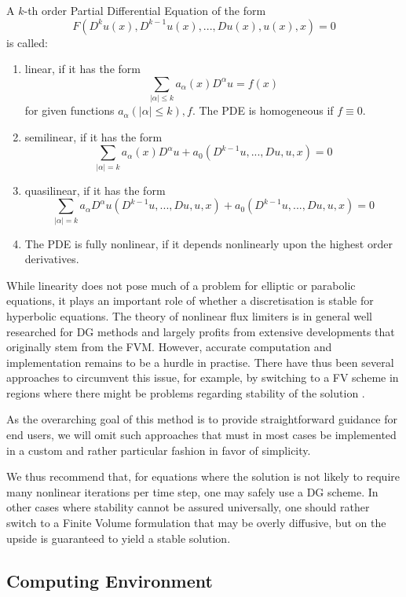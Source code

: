 \documentclass[sn-mathphys,Numbered]{sn-jnl}%
\theoremstyle{thmstyleone}%
\theoremstyle{thmstyletwo}%
\theoremstyle{thmstylethree}%
\begin{document}
A $k$-th order Partial Differential Equation of the form $$F(D^k u(x), D^{k-1} u(x),...,Du(x), u(x), x) = 0$$ is called:
\begin{enumerate}
    \item linear, if it has the form
    $$ \sum\limits_{\lvert \alpha \rvert \leq k} a_\alpha (x) D^\alpha u = f(x) $$
    for given functions $a_\alpha (\lvert \alpha \rvert \leq k), f$. The PDE is homogeneous if $f \equiv 0$. 
    \item semilinear, if it has the form
    $$ \sum\limits_{\lvert \alpha \rvert = k} a_\alpha (x) D^\alpha u + a_0 (D^{k-1}u,...,Du,u,x) = 0 $$
    \item quasilinear, if it has the form
    $$ \sum\limits_{\lvert \alpha \rvert = k} a_\alpha D^\alpha u (D^{k-1}u,...,Du,u,x) + a_0 (D^{k-1}u,...,Du,u,x) = 0 $$
    \item The PDE is fully nonlinear, if it depends nonlinearly upon the highest order derivatives.
\end{enumerate}
While linearity does not pose much of a problem for elliptic or parabolic equations, it plays an important role of whether a discretisation is stable for hyperbolic equations.
The theory of nonlinear flux limiters is in general well researched for DG methods and largely profits from extensive developments that originally stem from the FVM.
However, accurate computation and implementation remains to be a hurdle in practise.
There have thus been several approaches to circumvent this issue, for example, by switching to a FV scheme in regions where there might be problems regarding stability of the solution \cite{maltsevHybridDiscontinuousGalerkinfinite2023,sonntagShockCapturingDiscontinuous2014}.

As the overarching goal of this method is to provide straightforward guidance for end users, we will omit such approaches that must in most cases be implemented in a custom and rather particular fashion in favor of simplicity.

We thus recommend that, for equations where the solution is not likely to require many nonlinear iterations per time step, one may safely use a DG scheme.
In other cases where stability cannot be assured universally, one should rather switch to a Finite Volume formulation that may be overly diffusive, but on the upside is guaranteed to yield a stable solution.

\subsection{Computing Environment}\label{sec:hardware}
\end{document}
